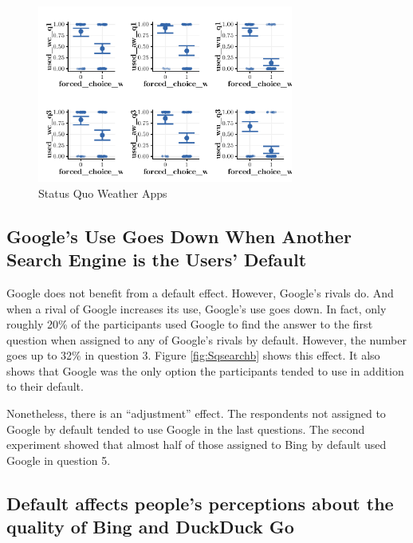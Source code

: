 \documentclass[
  11pt,
]{article}
\begin{document}
\begin{figure}

{\centering \includegraphics[width=0.75\textwidth]{Results-July25_files/figure-latex/Sqweather-1} 

}

\caption{Status Quo Weather Apps}\label{fig:Sqweather}
\end{figure}

\hypertarget{googles-use-goes-down-when-another-search-engine-is-the-users-default}{%
\subsection{Google's Use Goes Down When Another Search Engine is the Users' Default}\label{googles-use-goes-down-when-another-search-engine-is-the-users-default}}

Google does not benefit from a default effect. However, Google's rivals do. And when a rival of Google increases its use, Google's use goes down. In fact, only roughly 20\% of the participants used Google to find the answer to the first question when assigned to any of Google's rivals by default. However, the number goes up to 32\% in question 3. Figure \ref{fig:Sqsearchb} shows this effect. It also shows that Google was the only option the participants tended to use in addition to their default.

Nonetheless, there is an ``adjustment'' effect. The respondents not assigned to Google by default tended to use Google in the last questions. The second experiment showed that almost half of those assigned to Bing by default used Google in question 5.

\hypertarget{default-affects-peoples-perceptions-about-the-quality-of-bing-and-duckduck-go}{%
\subsection{Default affects people's perceptions about the quality of Bing and DuckDuck Go}\label{default-affects-peoples-perceptions-about-the-quality-of-bing-and-duckduck-go}}
\end{document}
